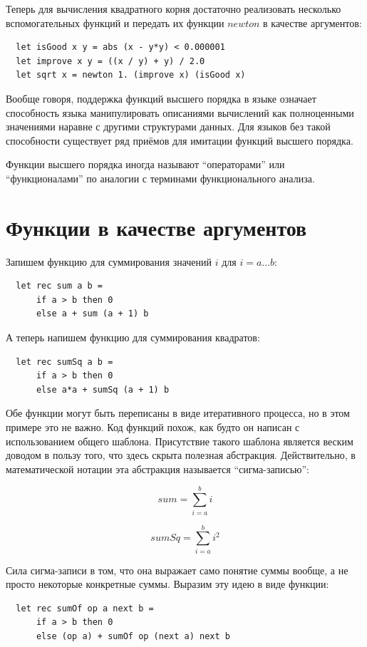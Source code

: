 \documentclass[a4paper,11pt]{article}
\begin{document}
Теперь для вычисления квадратного корня достаточно реализовать несколько
вспомогательных функций и передать их функции $newton$ в качестве аргументов:

\begin{lstlisting}
  let isGood x y = abs (x - y*y) < 0.000001
  let improve x y = ((x / y) + y) / 2.0
  let sqrt x = newton 1. (improve x) (isGood x)
\end{lstlisting}

Вообще говоря, поддержка функций высшего порядка в языке означает способность
языка манипулировать описаниями вычислений как полноценными значениями наравне
с другими структурами данных. Для языков без такой способности существует ряд
приёмов для имитации функций высшего порядка.

Функции высшего порядка иногда называют ``операторами'' или ``функционалами''
по аналогии с терминами функционального анализа.

\section{Функции в качестве аргументов}
Запишем функцию для суммирования значений $i$ для $i = a \ldots b$:
\begin{lstlisting}
  let rec sum a b = 
      if a > b then 0
      else a + sum (a + 1) b
\end{lstlisting}

А теперь напишем функцию для суммирования квадратов:
\begin{lstlisting}
  let rec sumSq a b = 
      if a > b then 0
      else a*a + sumSq (a + 1) b
\end{lstlisting}

Обе функции могут быть переписаны в виде итеративного процесса, но в этом
примере это не важно. Код функций похож, как будто он написан с использованием
общего шаблона. Присутствие такого шаблона является веским доводом в пользу
того, что здесь скрыта полезная абстракция. Действительно, в математической
нотации эта абстракция называется ``сигма-записью'':

\begin{equation*}
  sum = \sum_{i=a}^{b} i
\end{equation*}

\begin{equation*}
  sumSq = \sum_{i=a}^{b} i^2
\end{equation*}

Сила сигма-записи в том, что она выражает само понятие суммы вообще, а не
просто некоторые конкретные суммы. Выразим эту идею в виде функции:
\begin{lstlisting}
  let rec sumOf op a next b =
      if a > b then 0
      else (op a) + sumOf op (next a) next b
\end{lstlisting}
\end{document}
